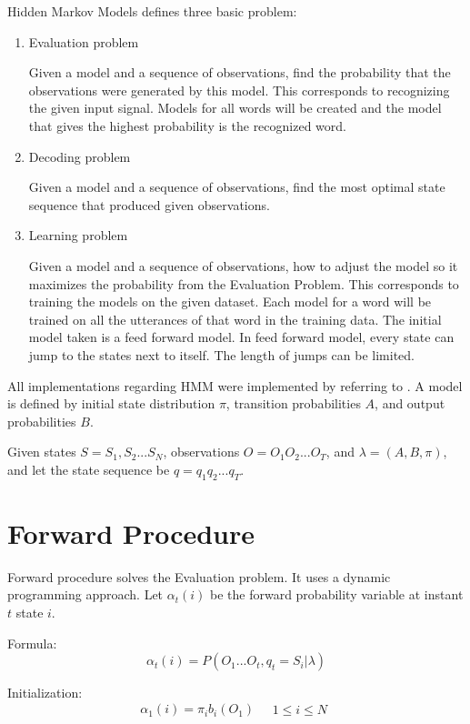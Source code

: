 Hidden Markov Models defines three basic problem:

\begin{enumerate}
    \item Evaluation problem

    Given a model and a sequence of observations, find the probability that the observations were generated by this model. This corresponds to recognizing the given input signal. Models for all words will be created and the model that gives the highest probability is the recognized word.

    \item Decoding problem

    Given a model and a sequence of observations, find the most optimal state sequence that produced given observations.

    \item Learning problem

    Given a model and a sequence of observations, how to adjust the model so it maximizes the probability from the Evaluation Problem. This corresponds to training the models on the given dataset. Each model for a word will be trained on all the utterances of that word in the training data. The initial model taken is a feed forward model. In feed forward model, every state can jump to the states next to itself. The length of jumps can be limited.

\end{enumerate}

All implementations regarding HMM were implemented by referring to \cite{18626}. A model is defined by initial state distribution $\pi$, transition probabilities $A$, and output probabilities $B$.

Given states $S = S_1, S_2 ... S_N$, observations $O = O_1O_2...O_T$, and $\lambda = (A, B, \pi)$, and let the state sequence be $q = q_1q_2...q_T$.

\section{Forward Procedure}
Forward procedure solves the Evaluation problem. It uses a dynamic programming approach. Let $\alpha_t(i)$ be the forward probability variable at instant $t$ state $i$.

Formula:
\begin{equation*}
    \alpha_t(i) = P(O_1...O_t, q_t = S_i | \lambda)
\end{equation*}

Initialization:
\begin{equation*}
    \alpha_1(i) = \pi_i b_i (O_1)
    \quad \begin{aligned} 1 \leq i \leq N \end{aligned}
\end{equation*}

